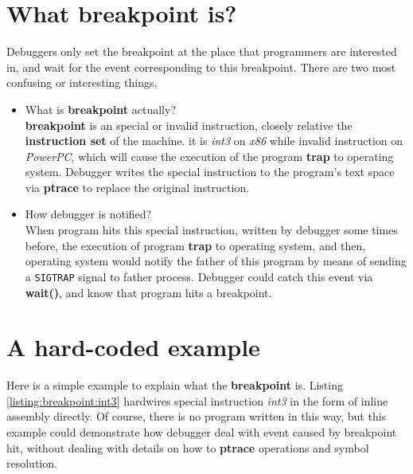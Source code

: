 \documentclass[12pt]{book}
\begin{document}
\begin{CJK}{UTF8}{gbsn}
\section{What breakpoint is?}
Debuggers only set the breakpoint at the place that programmers are interested in,
and wait for the event corresponding to this breakpoint.  There are two most 
confusing or interesting things,
 
\begin{itemize}
\item What is \textbf{breakpoint} actually?\\
\textbf{breakpoint} is an special or invalid instruction, closely relative the \textbf{instruction set} of the machine.
it is \emph{int3} on \textit{x86} while invalid instruction on \textit{PowerPC}, which will cause the execution of the program \textbf{trap} to operating system.
Debugger writes the special instruction to the program's text space via \textbf{ptrace} to replace the original instruction.

\item How debugger is notified?\\
When program hits this special instruction, written by debugger some times before, 
the execution of program \textbf{trap} to operating system,
and then, operating system would notify the father of this program by means of sending a 
\texttt{SIGTRAP} signal to father process.  Debugger could catch this event via \textbf{wait()}, 
and know that program hits a breakpoint.
\end{itemize}

\section{A hard-coded example}
Here is a simple example to explain what the \textbf{breakpoint} is.
Listing \ref{listing:breakpoint:int3} hardwires special instruction \emph{int3} 
in the form of inline assembly directly.  Of course, there is no program written 
in this way, but this example could demonstrate how debugger deal with event caused
by breakpoint hit, without dealing with details on how to \textbf{ptrace} operations
and symbol resolution.






\end{CJK}
\end{document}
